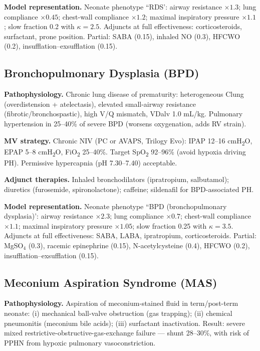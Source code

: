 \textbf{Model representation.} Neonate phenotype ``RDS': airway resistance $\times1.3$; lung compliance $\times0.45$; chest-wall compliance $\times1.2$; maximal inspiratory pressure $\times1.1$; slow fraction 0.2 with $\kappa=2.5$. Adjuncts at full effectiveness: corticosteroids, surfactant, prone position. Partial: SABA (0.15), inhaled NO (0.3), HFCWO (0.2), insufflation--exsufflation (0.15).

\subsection{Bronchopulmonary Dysplasia (BPD)}
\textbf{Pathophysiology.} Chronic lung disease of prematurity: heterogeneous Clung (overdistension + atelectasis), elevated small-airway resistance (fibrotic/bronchospastic), high V/Q mismatch, VDalv 1.0 mL/kg. Pulmonary hypertension in 25--40\% of severe BPD (worsens oxygenation, adds RV strain).

\textbf{MV strategy.} Chronic NIV (PC or AVAPS, Trilogy Evo): IPAP 12--16 cmH\textsubscript{2}O, EPAP 5--8 cmH\textsubscript{2}O, FiO\textsubscript{2} 25--40\%. Target SpO\textsubscript{2} 92--96\% (avoid hypoxia driving PH). Permissive hypercapnia (pH 7.30--7.40) acceptable.

\textbf{Adjunct therapies.} Inhaled bronchodilators (ipratropium, salbutamol); diuretics (furosemide, spironolactone); caffeine; sildenafil for BPD-associated PH.

\textbf{Model representation.} Neonate phenotype ``BPD (bronchopulmonary dysplasia)': airway resistance $\times2.3$; lung compliance $\times0.7$; chest-wall compliance $\times1.1$; maximal inspiratory pressure $\times1.05$; slow fraction 0.25 with $\kappa=3.5$. Adjuncts at full effectiveness: SABA, LABA, ipratropium, corticosteroids. Partial: MgSO$_4$ (0.3), racemic epinephrine (0.15), N-acetylcysteine (0.4), HFCWO (0.2), insufflation--exsufflation (0.15).

\subsection{Meconium Aspiration Syndrome (MAS)}
\textbf{Pathophysiology.} Aspiration of meconium-stained fluid in term/post-term neonate: (i) mechanical ball-valve obstruction (gas trapping); (ii) chemical pneumonitis (meconium bile acids); (iii) surfactant inactivation. Result: severe mixed restrictive-obstructive-gas-exchange failure --- shunt 28--30\%, with risk of PPHN from hypoxic pulmonary vasoconstriction.

